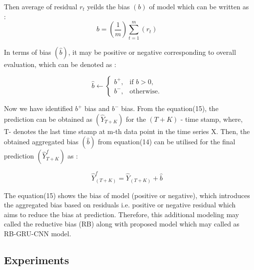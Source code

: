 \documentclass[a4paper, fleqn]{cas-sc}
\begin{document}
Then average of residual $r_{t}$ yeilds the bias $({b})$ of model which can be written as :
\begin{equation}
  {b} = \left ( \frac{1}{m} \right ) \sum_{t=1}^m\left ( r_{t} \right )
\end{equation}

In terms of bias $(\hat{b})$,  it may be positive or negative corresponding to overall evaluation,  which can be denoted as :
 
\begin{equation}
 {\hat{b}} \leftarrow   \begin {cases}  b^+,  & \text{if } b >  0,  \\
    b^-,  & \text{otherwise}. \end{cases}
\end{equation}

Now we have identified $b^+$ bias and $b^-$ bias. From the equation(15),  the prediction can be obtained as $(\hat{Y}_{T+K})$ for the $(T+K)$ - time stamp,  where,  T- denotes the last time stamp at m-th data point in the time series X. Then,  the obtained aggregated bias $(\hat{b})$ from equation(14) can be utilised for the final prediction $(\hat{Y}_{T+K}^f)$ as :

\begin{equation}
    \hat{Y}_{(T+K)}^f = \hat{Y}_{(T+K)} + \hat{b}
\end{equation}

The equation(15) shows the bias of model (positive or negative),  which introduces the aggregated bias based on residuals i.e. positive or negative residual which aims to reduce the bias at prediction. Therefore,  this additional modeling may called the reductive bias (RB) along with proposed model which may called as RB-GRU-CNN model.
 
\subsection{Experiments}
\end{document}
